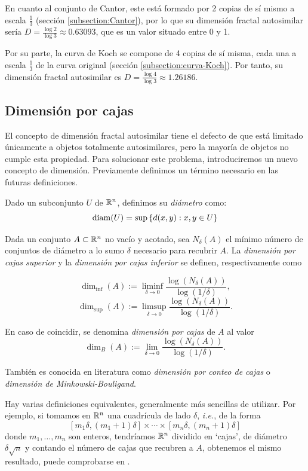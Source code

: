 En cuanto al conjunto de Cantor, este está formado por 2 copias de sí mismo a escala $\frac 1 3$ (sección \ref{subsection:Cantor}), por lo que su dimensión fractal autosimilar sería $D=\frac{\log 2}{\log 3} \approx 0.63093$, que es un valor situado entre 0 y 1.

Por su parte, la curva de Koch se compone de 4 copias de sí misma, cada una a escala $\frac 1 3$ de la curva original (sección \ref{subsection:curva-Koch}). Por tanto, su dimensión fractal autosimilar es $D=\frac{\log 4}{\log 3} \approx 1.26186$.

\subsection{Dimensión por cajas}
\label{subsection:dim-cajas}

El concepto de dimensión fractal autosimilar tiene el defecto de que está limitado únicamente a objetos totalmente autosimilares, pero la mayoría de objetos no cumple esta propiedad. Para solucionar este problema, introduciremos un nuevo concepto de dimensión. Previamente definimos un término necesario en las futuras definiciones.

\begin{definicion}
Dado un subconjunto $U$ de $\mathbb{R}^n$, definimos su \textit{diámetro} como:
$$
\mathrm{diam}(U)=\sup \left\lbrace d(x,y): x,y\in U\right\rbrace 
$$
\end{definicion}

Dada un conjunto $A\subset \mathbb{R}^n$ no vacío y acotado, sea $N_\delta(A)$ el mínimo número de conjuntos de diámetro a lo sumo $\delta$ necesario para recubrir $A$. La \textit{dimensión por cajas superior} y la \textit{dimensión por cajas inferior} se definen, respectivamente como

$$
\dim_{\inf}(A) := \liminf_{\delta\rightarrow 0}\frac{\log(N_\delta(A))}{\log(1/\delta)},
$$
$$
\dim_{\sup}(A) := \limsup_{\delta\rightarrow 0}\frac{\log(N_\delta(A))}{\log(1/\delta)}.
$$

En caso de coincidir, se denomina \textit{dimensión por cajas} de $A$ al valor 
\begin{equation}
  \label{eq:dim-cajas}
  \dim_{B}(A) := \lim_{\delta\rightarrow 0}\frac{\log(N_\delta(A))}{\log(1/\delta)}.
\end{equation}

También es conocida en literatura como \textit{dimensión por conteo de cajas} o \textit{dimensión de Minkowski-Bouligand}.

Hay varias definiciones equivalentes, generalmente más sencillas de utilizar. Por ejemplo, si tomamos en $\mathbb{R}^n$ una cuadrícula de lado $\delta$, \textit{i.e.}, de la forma
$$
[m_1 \delta, (m_1+1)\delta]\times\cdots\times[m_n \delta, (m_n+1)\delta]
$$
donde $m_1,\dots,m_n$ son enteros, tendríamos $\mathbb{R}^n$ dividido en `cajas', de diámetro $\delta\sqrt{n}$ y contando el número de cajas que recubren a $A$, obtenemos el mismo resultado, puede comprobarse en \cite[sección 3.1]{alma991007022459704990}.

